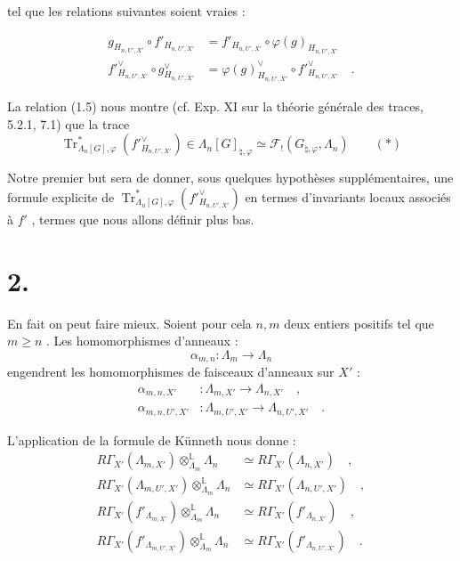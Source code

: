 \documentclass[11pt]{article}
\providecommand{\Tr}{\operatorname{Tr}}
\providecommand{\Tr}{\operatorname{Tr}}
\providecommand{\Tr}{\operatorname{Tr}}
\providecommand{\Tr}{\operatorname{Tr}}
\providecommand{\La}{\Lambda}
\providecommand{\Tr}{\operatorname{Tr}}
\begin{document}
tel que les relations suivantes soient vraies :

\begin{align}
\tag{1.4} g_{H_{n,U',X'}} \circ f'_{H_{n,U',X'}} &= f'_{H_{n,U',X'}} \circ \varphi(g)_{H_{n,U',X'}} \\
\tag{1.5} f'^\vee_{H_{n,U',X'}} \circ g^\vee_{H_{n,U',X'}} &= \varphi(g)^\vee_{H_{n,U',X'}} \circ f'^\vee_{H_{n,U',X'}} \quad .
\end{align}

La relation (1.5) nous montre (cf. Exp. XI sur la théorie générale des traces, 5.2.1, 7.1) que la trace
\[
\Tr^*_{\La_n[G],\varphi}(f'^\vee_{H_{n,U',X'}}) \in \La_n[G]_{\natural,\varphi} \simeq \mathcal{F}_!(G_{\natural,\varphi}, \La_n) \qquad (*)
\]

Notre premier but sera de donner, sous quelques hypothèses supplémentaires, une formule explicite de $\Tr^*_{\La_n[G],\varphi}(f'^\vee_{H_{n,U',X'}})$ en termes d'invariants locaux associés à $f'$ , termes que nous allons définir plus bas.

\section*{2.}
En fait on peut faire mieux. Soient pour cela $n,m$ deux entiers positifs tel que $m \geq n$ . Les homomorphismes d'anneaux :
\[
\alpha_{m,n} : \La_m \longrightarrow \La_n
\]
engendrent les homomorphismes de faisceaux d'anneaux sur $X'$ :
\begin{align*}
\alpha_{m,n,X'} &: \La_{m,X'} \longrightarrow \La_{n,X'} \quad , \\
\alpha_{m,n,U',X'} &: \La_{m,U',X'} \longrightarrow \La_{n,U',X'} \quad .
\end{align*}

L'application de la formule de Künneth nous donne :
\begin{align}
\tag{2.1} R\Gamma_{X'}(\La_{m,X'}) \otimes_{\La_m}^{\mathbb{L}} \La_n &\simeq R\Gamma_{X'}(\La_{n,X'}) \quad , \\
\tag{2.2} R\Gamma_{X'}(\La_{m,U',X'}) \otimes_{\La_m}^{\mathbb{L}} \La_n &\simeq R\Gamma_{X'}(\La_{n,U',X'}) \quad , \\
\tag{2.3} R\Gamma_{X'}(f'_{\La_{m,X'}}) \otimes_{\La_m}^{\mathbb{L}} \La_n &\simeq R\Gamma_{X'}(f'_{\La_{n,X'}}) \quad , \\
\tag{2.4} R\Gamma_{X'}(f'_{\La_{m,U',X'}}) \otimes_{\La_m}^{\mathbb{L}} \La_n &\simeq R\Gamma_{X'}(f'_{\La_{n,U',X'}}) \quad .
\end{align}
\end{document}
